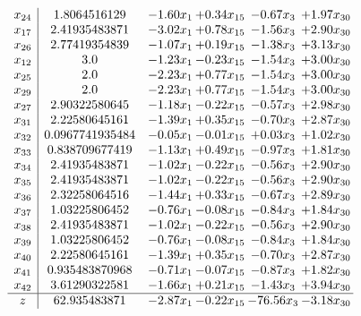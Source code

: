 \documentclass[8pt]{article}
\begin{document}
\[\begin{array}{c| c c@{\hskip 2pt} c@{\hskip 2pt} c@{\hskip 2pt} c@{\hskip 2pt} }
 x_{24}   &  1.8064516129 & -1.60 x_{1} & +  0.34 x_{15} & -0.67 x_{3} & +  1.97 x_{30}\\
 x_{17}   &  2.41935483871 & -3.02 x_{1} & +  0.78 x_{15} & -1.56 x_{3} & +  2.90 x_{30}\\
 x_{26}   &  2.77419354839 & -1.07 x_{1} & +  0.19 x_{15} & -1.38 x_{3} & +  3.13 x_{30}\\
 x_{12}   &  3.0 & -1.23 x_{1} & -0.23 x_{15} & -1.54 x_{3} & +  3.00 x_{30}\\
 x_{25}   &  2.0 & -2.23 x_{1} & +  0.77 x_{15} & -1.54 x_{3} & +  3.00 x_{30}\\
 x_{29}   &  2.0 & -2.23 x_{1} & +  0.77 x_{15} & -1.54 x_{3} & +  3.00 x_{30}\\
 x_{27}   &  2.90322580645 & -1.18 x_{1} & -0.22 x_{15} & -0.57 x_{3} & +  2.98 x_{30}\\
 x_{31}   &  2.22580645161 & -1.39 x_{1} & +  0.35 x_{15} & -0.70 x_{3} & +  2.87 x_{30}\\
 x_{32}   &  0.0967741935484 & -0.05 x_{1} & -0.01 x_{15} & +  0.03 x_{3} & +  1.02 x_{30}\\
 x_{33}   &  0.838709677419 & -1.13 x_{1} & +  0.49 x_{15} & -0.97 x_{3} & +  1.81 x_{30}\\
 x_{34}   &  2.41935483871 & -1.02 x_{1} & -0.22 x_{15} & -0.56 x_{3} & +  2.90 x_{30}\\
 x_{35}   &  2.41935483871 & -1.02 x_{1} & -0.22 x_{15} & -0.56 x_{3} & +  2.90 x_{30}\\
 x_{36}   &  2.32258064516 & -1.44 x_{1} & +  0.33 x_{15} & -0.67 x_{3} & +  2.89 x_{30}\\
 x_{37}   &  1.03225806452 & -0.76 x_{1} & -0.08 x_{15} & -0.84 x_{3} & +  1.84 x_{30}\\
 x_{38}   &  2.41935483871 & -1.02 x_{1} & -0.22 x_{15} & -0.56 x_{3} & +  2.90 x_{30}\\
 x_{39}   &  1.03225806452 & -0.76 x_{1} & -0.08 x_{15} & -0.84 x_{3} & +  1.84 x_{30}\\
 x_{40}   &  2.22580645161 & -1.39 x_{1} & +  0.35 x_{15} & -0.70 x_{3} & +  2.87 x_{30}\\
 x_{41}   &  0.935483870968 & -0.71 x_{1} & -0.07 x_{15} & -0.87 x_{3} & +  1.82 x_{30}\\
 x_{42}   &  3.61290322581 & -1.66 x_{1} & +  0.21 x_{15} & -1.43 x_{3} & +  3.94 x_{30}\\
\hline
z    &  62.935483871 & -2.87 x_{1} & -0.22 x_{15} & -76.56 x_{3} & -3.18 x_{30}\\
\end{array}\]
\end{document}
